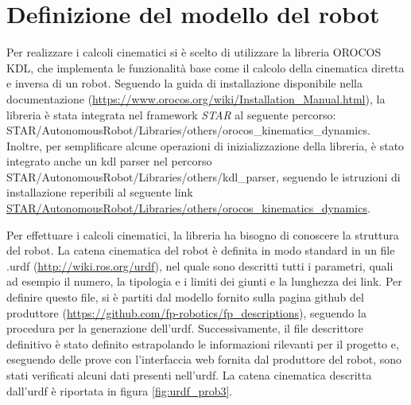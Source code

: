 \section{Definizione del modello del robot}
Per realizzare i calcoli cinematici si è scelto di utilizzare la libreria OROCOS KDL, che implementa le funzionalità base come il calcolo della cinematica diretta e inversa di un robot. Seguendo la guida di installazione disponibile nella documentazione (\url{https://www.orocos.org/wiki/Installation_Manual.html}), la libreria è stata integrata nel framework \textit{STAR} al seguente percorso: STAR/AutonomousRobot/Libraries/others/orocos\_kinematics\_dynamics. Inoltre, per semplificare alcune operazioni di inizializzazione della libreria, è stato integrato anche un kdl parser nel percorso STAR/AutonomousRobot/Libraries/others/kdl\_parser, seguendo le istruzioni di installazione reperibili al seguente link \url{STAR/AutonomousRobot/Libraries/others/orocos\_kinematics\_dynamics}. 

Per effettuare i calcoli cinematici, la libreria ha bisogno di conoscere la struttura del robot. La catena cinematica del robot è definita in modo standard in un file .urdf (\url{http://wiki.ros.org/urdf}), nel quale sono descritti tutti i parametri, quali ad esempio il numero, la tipologia e i limiti dei giunti e la lunghezza dei link. Per definire questo file, si è partiti dal modello fornito sulla pagina github del produttore (\url{https://github.com/fp-robotics/fp_descriptions}), seguendo la procedura per la generazione dell'urdf. Successivamente, il file descrittore definitivo è stato definito estrapolando le informazioni rilevanti per il progetto e, eseguendo delle prove con l'interfaccia web fornita dal produttore del robot, sono stati verificati alcuni dati presenti nell'urdf. La catena cinematica descritta dall'urdf è riportata in figura \ref{fig:urdf_prob3}.

